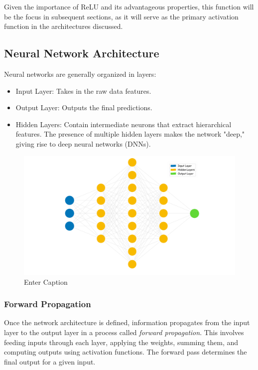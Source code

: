 Given the importance of ReLU and its advantageous properties, this function will be the focus in subsequent sections, as it will serve as the primary activation function in the architectures discussed.

\subsection{Neural Network Architecture}
Neural networks are generally organized in layers:
\begin{itemize}
    \item Input Layer: Takes in the raw data features.
    \item Output Layer: Outputs the final predictions.
    \item Hidden Layers: Contain intermediate neurons that extract hierarchical features. The presence of multiple hidden layers makes the network "deep," giving rise to deep neural networks (DNNs).
\end{itemize}

\begin{figure}
    \centering
    \includegraphics[width=0.75\linewidth]{LateX//figs/nn_intro_def.pdf}
    \caption{Enter Caption}
    \label{fig:enter-label}
\end{figure}

\subsubsection*{Forward Propagation}
Once the network architecture is defined, information propagates from the input layer to the output layer in a process called \textit{forward propagation}. This involves feeding inputs through each layer, applying the weights, summing them, and computing outputs using activation functions. The forward pass determines the final output for a given input.

